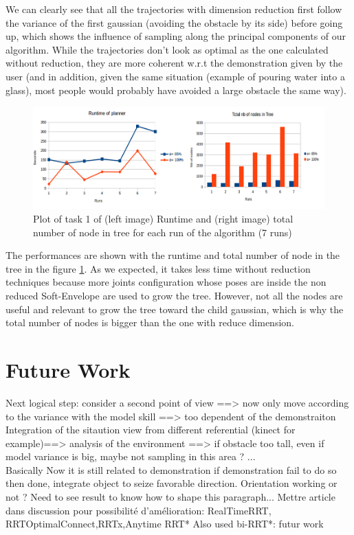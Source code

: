\documentclass[letterpaper, 10 pt, conference]{ieeeconf}  %
\begin{document}
We can clearly see that all the trajectories with dimension reduction first follow the variance of the first gaussian (avoiding the obstacle by its side) before going up, which shows the influence of sampling along the principal components of our algorithm. While the trajectories don't look as optimal as the one calculated without reduction, they are more coherent w.r.t the demonstration given by the user (and in addition, given the same situation (example of pouring water into a glass), most people would probably have avoided a large obstacle the same way). \\
\begin{figure}[h]
	\centering
	\includegraphics[scale=0.37]{figure/plotGraphMixTask1.png}
	\caption{Plot of task 1 of (left image) Runtime and (right image) total number of node in tree  for each run of the algorithm (7 runs) }
	\label{plotGraphMixTask1}
\end{figure}
The performances are shown with the runtime and total number of node in the tree in the figure \ref{plotGraphMixTask1}. 
As we expected, it takes less time without reduction techniques because more joints configuration whose poses are inside the non reduced Soft-Envelope are used to grow the tree. However, not all the nodes are useful and relevant to grow the tree toward the child gaussian, which is why the total number of nodes is bigger than the one with reduce dimension. 


\section{Future Work}
Next logical step: consider a second point of view ==> now only move according to the variance with the model skill ==> too dependent of the demonstraiton
Integration of the sitaution view from different referential (kinect for example)==> analysis of the environment ==> if obstacle too tall, even if model variance is big, maybe not sampling in this area ? ... \\
Basically Now it is still related to demonstration if demonstration fail to do so then done, integrate object to seize favorable direction.
Orientation working or not ?  Need to see result to know how to shape this paragraph...
Mettre article dans discussion pour possibilité d'amélioration:
RealTimeRRT, RRTOptimalConnect,RRTx,Anytime RRT*
Also used bi-RRT*: futur work
\end{document}
